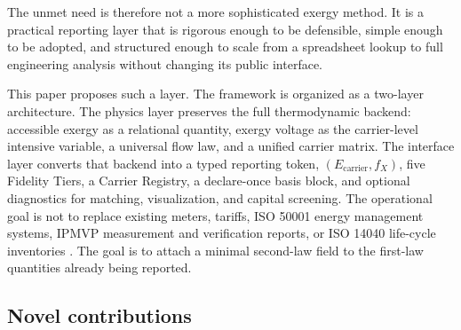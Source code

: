 \documentclass[11pt]{article}
\newcommand{\fx}{f_X}
\begin{document}
The unmet need is therefore not a more sophisticated exergy method. It is a practical reporting layer that is rigorous enough to be defensible, simple enough to be adopted, and structured enough to scale from a spreadsheet lookup to full engineering analysis without changing its public interface.

This paper proposes such a layer. The framework is organized as a two-layer architecture. The physics layer preserves the full thermodynamic backend: accessible exergy as a relational quantity, exergy voltage as the carrier-level intensive variable, a universal flow law, and a unified carrier matrix. The interface layer converts that backend into a typed reporting token, $(E_{\mathrm{carrier}},\fx)$, five Fidelity Tiers, a Carrier Registry, a declare-once basis block, and optional diagnostics for matching, visualization, and capital screening. The operational goal is not to replace existing meters, tariffs, ISO 50001 energy management systems, IPMVP measurement and verification reports, or ISO 14040 life-cycle inventories \cite{evo2022,iso14040,iso50001}. The goal is to attach a minimal second-law field to the first-law quantities already being reported.


\subsection*{Novel contributions}
\end{document}

